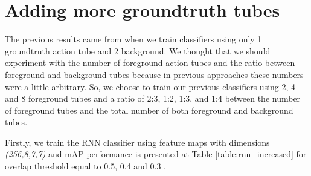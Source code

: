 \section{Adding more groundtruth tubes}

The previous results came from when we train classifiers using only 1 groundtruth action tube and 2 background. We thought that we should
experiment with the number of foreground action tubes and the ratio between foreground and background tubes because in previous approaches
these numbers were a little arbitrary. So, we choose to train our previous classifiers using 2, 4 and 8 foreground tubes and a ratio of 2:3,
1:2, 1:3, and 1:4 between the number of foreground tubes and the total number of both foreground and background tubes. \par

Firstly, we train the RNN classifier using feature maps with dimensions \textit{(256,8,7,7)} and mAP performance is presented at Table 
\ref{table:rnn_increased} for overlap threshold equal to 0.5, 0.4 and 0.3 . 

